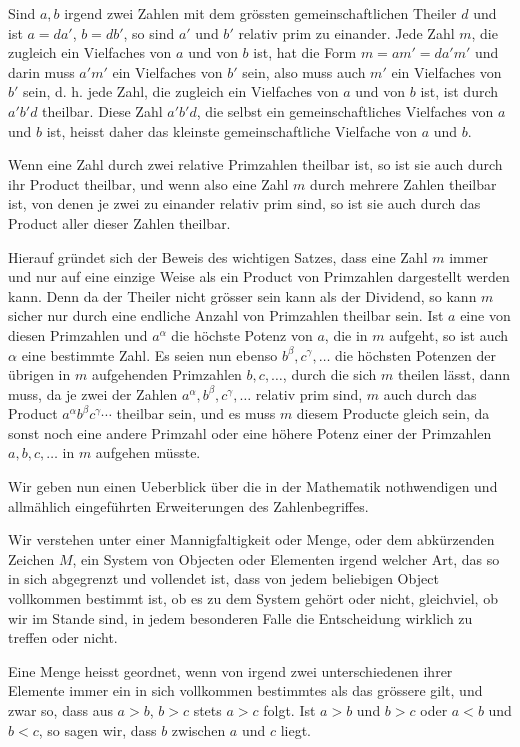 \documentclass[11pt]{article}
\begin{document}
Sind $a,b$ irgend zwei Zahlen mit dem grössten gemeinschaftlichen Theiler $d$ und ist $a=da'$, $b=db'$, so sind $a'$ und $b'$ relativ prim zu einander. Jede Zahl $m$, die zugleich ein Vielfaches von $a$ und von $b$ ist, hat die Form $m=am'=da'm'$ und darin muss $a'm'$ ein Vielfaches von $b'$ sein, also muss auch $m'$ ein Vielfaches von $b'$ sein, d. h. jede Zahl, die zugleich ein Vielfaches von $a$ und von $b$ ist, ist durch $a'b'd$ theilbar. Diese Zahl $a'b'd$, die selbst ein gemeinschaftliches Vielfaches von $a$ und $b$ ist, heisst daher das kleinste gemeinschaftliche Vielfache von $a$ und $b$.

Wenn eine Zahl durch zwei relative Primzahlen theilbar ist, so ist sie auch durch ihr Product theilbar, und wenn also eine Zahl $m$ durch mehrere Zahlen theilbar ist, von denen je zwei zu einander relativ prim sind, so ist sie auch durch das Product aller dieser Zahlen theilbar.

Hierauf gründet sich der Beweis des wichtigen Satzes, dass eine Zahl $m$ immer und nur auf eine einzige Weise als ein Product von Primzahlen dargestellt werden kann. Denn da der Theiler nicht grösser sein kann als der Dividend, so kann $m$ sicher nur durch eine endliche Anzahl von Primzahlen theilbar sein. Ist $a$ eine von diesen Primzahlen und $a^\alpha$ die höchste Potenz von $a$, die in $m$ aufgeht, so ist auch $\alpha$ eine bestimmte Zahl. Es seien nun ebenso $b^\beta,c^\gamma,\ldots$ die höchsten Potenzen der übrigen in $m$ aufgehenden Primzahlen $b,c,\ldots$, durch die sich $m$ theilen lässt, dann muss, da je zwei der Zahlen $a^\alpha,b^\beta,c^\gamma,\ldots$ relativ prim sind, $m$ auch durch das Product $a^\alpha b^\beta c^\gamma\cdots$ theilbar sein, und es muss $m$ diesem Producte gleich sein, da sonst noch eine andere Primzahl oder eine höhere Potenz einer der Primzahlen $a,b,c,\ldots$ in $m$ aufgehen müsste.

Wir geben nun einen Ueberblick über die in der Mathematik nothwendigen und allmählich eingeführten Erweiterungen des Zahlenbegriffes.

Wir verstehen unter einer Mannigfaltigkeit oder Menge, oder dem abkürzenden Zeichen $M$, ein System von Objecten oder Elementen irgend welcher Art, das so in sich abgegrenzt und vollendet ist, dass von jedem beliebigen Object vollkommen bestimmt ist, ob es zu dem System gehört oder nicht, gleichviel, ob wir im Stande sind, in jedem besonderen Falle die Entscheidung wirklich zu treffen oder nicht.

Eine Menge heisst geordnet, wenn von irgend zwei unterschiedenen ihrer Elemente immer ein in sich vollkommen bestimmtes als das grössere gilt, und zwar so, dass aus $a>b$, $b>c$ stets $a>c$ folgt. Ist $a>b$ und $b>c$ oder $a<b$ und $b<c$, so sagen wir, dass $b$ zwischen $a$ und $c$ liegt.
\end{document}
